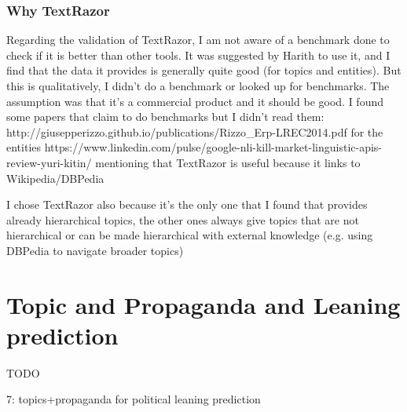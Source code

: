 \subsubsection{Why TextRazor}
Regarding the validation of TextRazor, I am not aware of a benchmark done to check if it is better than other tools. It was suggested by Harith to use it, and I find that the data it provides is generally quite good (for topics and entities). But this is qualitatively, I didn’t do a benchmark or looked up for benchmarks. The assumption was that it’s a commercial product and it should be good.
I found some papers that claim to do benchmarks but I didn’t read them:
http://giusepperizzo.github.io/publications/Rizzo\_Erp-LREC2014.pdf for the entities
https://www.linkedin.com/pulse/google-nli-kill-market-linguistic-apis-review-yuri-kitin/ mentioning that TextRazor is useful because it links to Wikipedia/DBPedia

I chose TextRazor also because it’s the only one that I found that provides already hierarchical topics, the other ones always give topics that are not hierarchical or can be made hierarchical with external knowledge (e.g. using DBPedia to navigate broader topics)

\section{Topic and Propaganda and Leaning prediction}

TODO

7: topics+propaganda for political leaning prediction